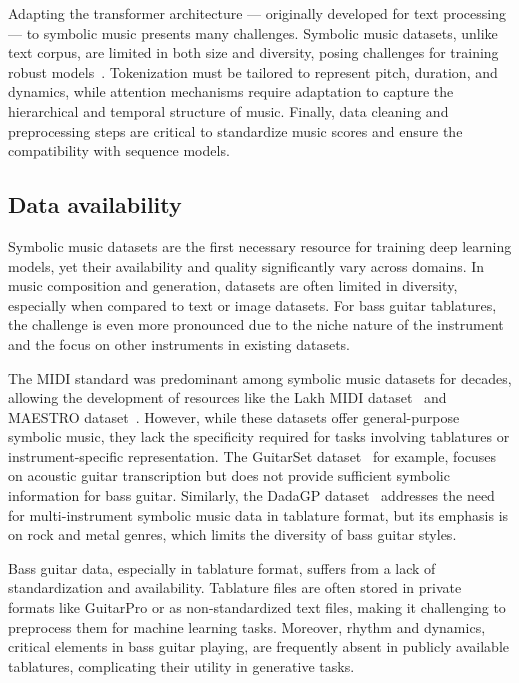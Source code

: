 Adapting the transformer architecture — originally developed for text processing — to symbolic music presents many challenges.
Symbolic music datasets, unlike text corpus, are limited in both size and diversity, posing challenges for training robust models~\cite{le_natural_2024}.
Tokenization must be tailored to represent pitch, duration, and dynamics, while attention mechanisms require adaptation to capture the hierarchical and temporal structure of music.
Finally, data cleaning and preprocessing steps are critical to standardize music scores and ensure the compatibility with sequence models.


\subsection{Data availability}


Symbolic music datasets are the first necessary resource for training deep learning models, yet their availability and quality significantly vary across domains.
In music composition and generation, datasets are often limited in diversity, especially when compared to text or image datasets.
For bass guitar tablatures, the challenge is even more pronounced due to the niche nature of the instrument and the focus on other instruments in existing datasets.

The MIDI standard was predominant among symbolic music datasets for decades, allowing the development of resources like the Lakh MIDI dataset~\cite{raffel_learning-based_2016} and MAESTRO dataset~\cite{hawthorne_enabling_2018}.
However, while these datasets offer general-purpose symbolic music, they lack the specificity required for tasks involving tablatures or instrument-specific representation.
The GuitarSet dataset~\cite{xi_guitarset_2018} for example, focuses on acoustic guitar transcription but does not provide sufficient symbolic information for bass guitar.
Similarly, the DadaGP dataset~\cite{sarmento_dadagp_2021} addresses the need for multi-instrument symbolic music data in tablature format, but its emphasis is on rock and metal genres, which limits the diversity of bass guitar styles.


Bass guitar data, especially in tablature format, suffers from a lack of standardization and availability.
Tablature files are often stored in private formats like GuitarPro or as non-standardized text files, making it challenging to preprocess them for machine learning tasks.
Moreover, rhythm and dynamics, critical elements in bass guitar playing, are frequently absent in publicly available tablatures, complicating their utility in generative tasks.


